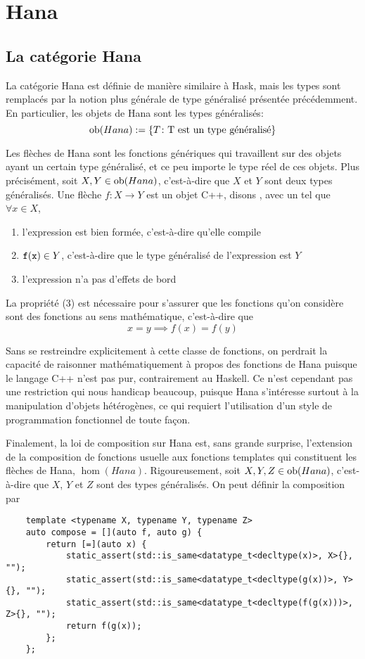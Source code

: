 \section{Hana}


\subsection{La catégorie Hana}
La catégorie Hana est définie de manière similaire à Hask, mais les types
sont remplacés par la notion plus générale de type généralisé présentée
précédemment. En particulier, les objets de Hana sont les types généralisés:
\[
    \mathrm{ob}(Hana) := \{ T \colon \text{T est un type généralisé} \}
\]

Les flèches de Hana sont les fonctions génériques qui travaillent sur des
objets ayant un certain type généralisé, et ce peu importe le type réel de ces
objets. Plus précisément, soit $X, Y \in \mathrm{ob}(Hana)$, c'est-à-dire que $X$ et $Y$
sont deux types généralisés. Une flèche $f : X \to Y$ est un objet C++, disons
, avec un  tel que $\forall x \in X$,
\begin{enumerate}
    \item l'expression  est bien formée, c'est-à-dire qu'elle compile
    \item ${\tt f(x)} \in Y$, c'est-à-dire que le type généralisé de l'expression  est $Y$
    \item l'expression  n'a pas d'effets de bord
\end{enumerate}

La propriété (3) est nécessaire pour s'assurer que les fonctions qu'on
considère sont des fonctions au sens mathématique, c'est-à-dire que
\[
    x = y \implies f(x) = f(y)
\]

Sans se restreindre explicitement à cette classe de fonctions, on perdrait la
capacité de raisonner mathématiquement à propos des fonctions de Hana puisque
le langage C++ n'est pas pur, contrairement au Haskell. Ce n'est cependant pas
une restriction qui nous handicap beaucoup, puisque Hana s'intéresse surtout à
la manipulation d'objets hétérogènes, ce qui requiert l'utilisation d'un style
de programmation fonctionnel de toute façon.

Finalement, la loi de composition sur Hana est, sans grande surprise,
l'extension de la composition de fonctions usuelle aux fonctions templates
qui constituent les flèches de Hana, $\hom(Hana)$. Rigoureusement, soit
$X, Y, Z \in \mathrm{ob}(Hana)$, c'est-à-dire que $X$, $Y$ et $Z$ sont des types
généralisés. On peut définir la composition par
\begin{verbatim}
    template <typename X, typename Y, typename Z>
    auto compose = [](auto f, auto g) {
        return [=](auto x) {
            static_assert(std::is_same<datatype_t<decltype(x)>, X>{}, "");
            static_assert(std::is_same<datatype_t<decltype(g(x))>, Y>{}, "");
            static_assert(std::is_same<datatype_t<decltype(f(g(x)))>, Z>{}, "");
            return f(g(x));
        };
    };
\end{verbatim}

